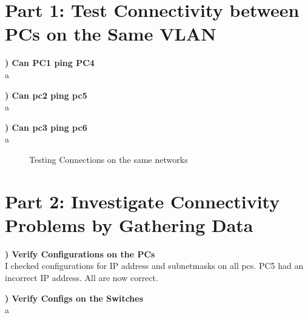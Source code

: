 \documentclass{report}
\title{\classinfo}
\author{\semester}
\date{\today}
\newcommand{\mysection}[1]{\section*{#1}}
\newcommand{\mysubsection}[2]{\textbf{\romannumeral #1) #2}}
\begin{document}
\maketitle

\mysection{\textbf{Part 1: Test Connectivity between PCs on the Same VLAN}}

\mysubsection{1}{Can PC1 ping PC4}
\\a

\noindent\mysubsection{2}{Can pc2 ping pc5}
\\a

\noindent\mysubsection{3}{Can pc3 ping pc6}
\\a


\begin{figure}[!hbt]\centering
{}\par
{}\hfill
{}\par
\caption{Testing Connections on the same networks}
\label{Ch11}
\end{figure}




\mysection{\textbf{Part 2: Investigate Connectivity Problems by Gathering Data}}

\mysubsection{1}{Verify Configurations on the PCs}
\\I checked configurations for IP address and subnetmasks on all pcs. 
PC5 had an incorrect IP address. All are now correct.

\noindent\mysubsection{2}{Verify Configs on the Switches}
\\a


\end{document}
